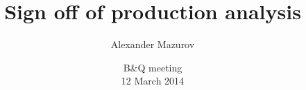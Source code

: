 \title{Sign off of \chib production analysis}
\author{Alexander Mazurov}
\date{B\&Q meeting\\12 March 2014}
